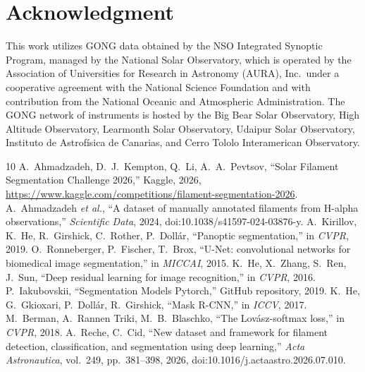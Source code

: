 \documentclass[conference]{IEEEtran}
\begin{document}
\section*{Acknowledgment}
This work utilizes GONG data obtained by the NSO Integrated Synoptic Program, managed by the National Solar
Observatory, which is operated by the Association of Universities for Research in Astronomy (AURA), Inc.\ under
a cooperative agreement with the National Science Foundation and with contribution from the National Oceanic
and Atmospheric Administration. The GONG network of instruments is hosted by the Big Bear Solar Observatory,
High Altitude Observatory, Learmonth Solar Observatory, Udaipur Solar Observatory, Instituto de
Astrof\'isica de Canarias, and Cerro Tololo Interamerican Observatory.

\begin{thebibliography}{10}
 A.~Ahmadzadeh, D.~J.~Kempton, Q.~Li, A.~A.~Pevtsov, ``Solar Filament Segmentation Challenge 2026,'' Kaggle, 2026, \url{https://www.kaggle.com/competitions/filament-segmentation-2026}.
 A.~Ahmadzadeh \emph{et al.}, ``A dataset of manually annotated filaments from H-alpha observations,'' \emph{Scientific Data}, 2024, doi:10.1038/s41597-024-03876-y.
 A.~Kirillov, K.~He, R.~Girshick, C.~Rother, P.~Doll\'ar, ``Panoptic segmentation,'' in \emph{CVPR}, 2019.
 O.~Ronneberger, P.~Fischer, T.~Brox, ``U-Net: convolutional networks for biomedical image segmentation,'' in \emph{MICCAI}, 2015.
 K.~He, X.~Zhang, S.~Ren, J.~Sun, ``Deep residual learning for image recognition,'' in \emph{CVPR}, 2016.
 P.~Iakubovskii, ``Segmentation Models Pytorch,'' GitHub repository, 2019.
 K.~He, G.~Gkioxari, P.~Doll\'ar, R.~Girshick, ``Mask R-CNN,'' in \emph{ICCV}, 2017.
 M.~Berman, A.~Rannen Triki, M.~B.~Blaschko, ``The Lov\'asz-softmax loss,'' in \emph{CVPR}, 2018.
 A.~Reche, C.~Cid, ``New dataset and framework for filament detection, classification, and segmentation using deep learning,'' \emph{Acta Astronautica}, vol.~249, pp.~381--398, 2026, doi:10.1016/j.actaastro.2026.07.010.
\end{thebibliography}
\end{document}
